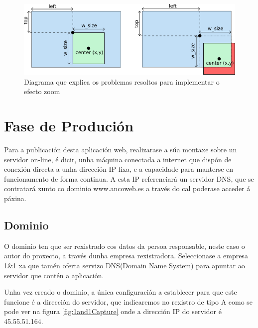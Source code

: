    \begin{figure}[htp]
    \begin{center}
        \includegraphics[scale=0.8]{figures/centerToLeftTop.png}
        \caption{Diagrama que explica os problemas resoltos para implementar o efecto zoom}
    \label{fig:centerToLeftTop}
    \end{center}
    \end{figure}
    
\section{Fase de Produción}

    Para a publicación desta aplicación web, realizarase a súa montaxe sobre un servidor on-line,
    é dicir, unha máquina conectada a internet que dispón de conexión directa a unha dirección IP
    fixa, e a capacidade para manterse en funcionamento de forma continua. A esta IP referenciará un
    servidor DNS, que se contratará xunto co dominio www.ancoweb.es a través do cal poderase acceder
    á páxina.

    \subsection{Dominio}
        O dominio ten que ser rexistrado cos datos da persoa responsable, neste caso o autor do 
        proxecto, a través dunha empresa rexistradora. Seleccionase a empresa 1\&1
        \cite{1and1-website} xa que tamén oferta servizo DNS(Domain Name System) para apuntar ao 
        servidor que contén a aplicación.
        
        Unha vez creado o dominio, a única configuración a establecer para que este funcione 
        é a dirección do servidor, que indicaremos no rexistro de tipo A como se pode
        ver na figura \ref{fig:1and1Capture} onde a dirección IP do servidor é 45.55.51.164.

